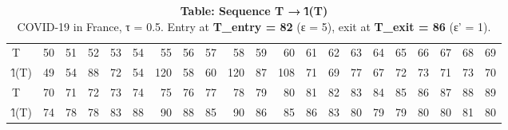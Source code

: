 \begin{table}[t]
\caption*{
{\large \textbf{Table: Sequence T → l̂(T)}} \\ 
{\small COVID-19 in France, τ = 0.5. Entry at \textbf{T\_entry = 82} (ε = 5), exit at \textbf{T\_exit = 86} (ε' = 1).}
} 
\begin{tabular*}{\linewidth}{@{\extracolsep{\fill}}lrrrrrrrrrrrrrrrrrrrr}
\toprule
 &  &  &  &  &  &  &  &  &  &  &  &  &  &  &  &  &  &  &  &  \\ 
\midrule\addlinespace[2.5pt]
T & 50 & 51 & 52 & 53 & 54 & 55 & 56 & 57 & 58 & 59 & 60 & 61 & 62 & 63 & 64 & 65 & 66 & 67 & 68 & 69 \\ 
l̂(T) & 49 & 54 & 88 & 72 & 54 & 120 & 58 & 60 & 120 & 87 & 108 & 71 & 69 & 77 & 67 & 72 & 73 & 71 & 73 & 70 \\ 
T & 70 & 71 & 72 & 73 & 74 & 75 & 76 & 77 & 78 & 79 & 80 & 81 & 82 & 83 & 84 & 85 & 86 & 87 & 88 & 89 \\ 
l̂(T) & 74 & 78 & 78 & 83 & 88 & 90 & 88 & 85 & 90 & 86 & 85 & 86 & 83 & 80 & 79 & 79 & 80 & 80 & 81 & 80 \\ 
\bottomrule
\end{tabular*}
\end{table}

